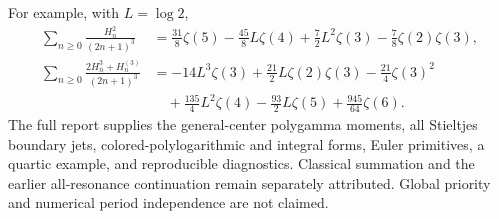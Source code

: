 For example, with $L=\log2$,
\begin{align*}
 \sum_{n\ge0}\frac{H_n^2}{(2n+1)^3}
 &=\frac{31}{8}\zeta(5)-\frac{45}{8}L\zeta(4)
       +\frac72L^2\zeta(3)-\frac78\zeta(2)\zeta(3),\\
 \sum_{n\ge0}\frac{2H_n^3+H_n^{(3)}}{(2n+1)^3}
 &=-14L^3\zeta(3)+\frac{21}{2}L\zeta(2)\zeta(3)-\frac{21}{4}\zeta(3)^2\\
 &\quad+\frac{135}{4}L^2\zeta(4)-\frac{93}{2}L\zeta(5)
       +\frac{945}{64}\zeta(6).
\end{align*}
The full report supplies the general-center polygamma moments,
all Stieltjes boundary jets, colored-polylogarithmic and integral forms,
Euler primitives, a quartic example, and reproducible diagnostics.
Classical summation and the earlier all-resonance continuation remain
separately attributed. Global priority and numerical period independence
are not claimed.
